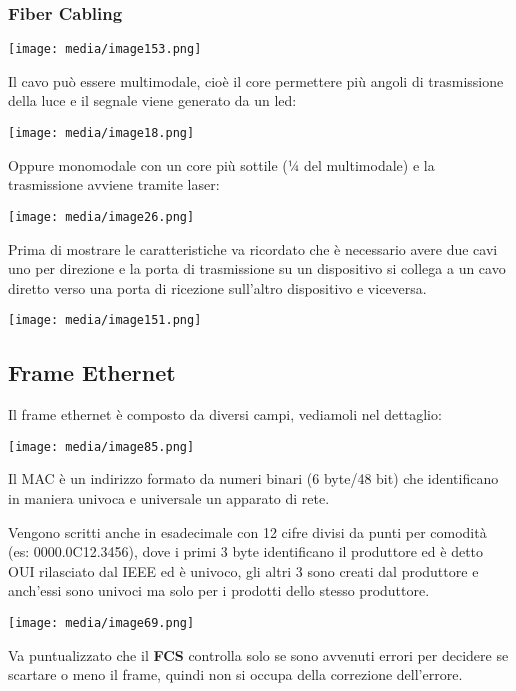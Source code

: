 \subsubsection{Fiber Cabling}\label{fiber-cabling}

\texttt{[image: media/image153.png]}

Il cavo può essere multimodale, cioè il core permettere più angoli di
trasmissione della luce e il segnale viene generato da un led:

\texttt{[image: media/image18.png]}

Oppure monomodale con un core più sottile (¼ del multimodale) e la
trasmissione avviene tramite laser:

\texttt{[image: media/image26.png]}

Prima di mostrare le caratteristiche va ricordato che è necessario avere
due cavi uno per direzione e la porta di trasmissione su un dispositivo
si collega a un cavo diretto verso una porta di ricezione sull'altro
dispositivo e viceversa.

\texttt{[image: media/image151.png]}

\subsection{Frame Ethernet}\label{frame-ethernet}

Il frame ethernet è composto da diversi campi, vediamoli nel dettaglio:

\texttt{[image: media/image85.png]}

Il MAC è un indirizzo formato da numeri binari (6 byte/48 bit) che
identificano in maniera univoca e universale un apparato di rete.

Vengono scritti anche in esadecimale con 12 cifre divisi da punti per
comodità (es: 0000.0C12.3456), dove i primi 3 byte identificano il
produttore ed è detto OUI rilasciato dal IEEE ed è univoco, gli altri 3
sono creati dal produttore e anch'essi sono univoci ma solo per i
prodotti dello stesso produttore.

\texttt{[image: media/image69.png]}

Va puntualizzato che il \textbf{FCS} controlla solo se sono avvenuti
errori per decidere se scartare o meno il frame, quindi non si occupa
della correzione dell'errore.

